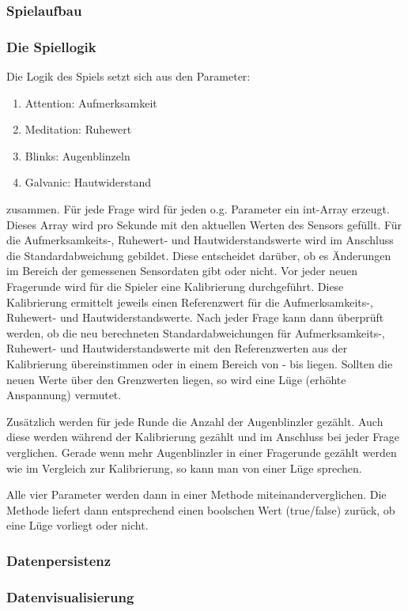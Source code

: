 	\subsubsection{Spielaufbau}
	
	
	\subsubsection*{Die Spiellogik}
	
	Die Logik des Spiels setzt sich aus den Parameter:
	\begin{enumerate}
	\item Attention: Aufmerksamkeit
	\item Meditation: Ruhewert
	\item Blinks: Augenblinzeln
	\item Galvanic: Hautwiderstand
	\end{enumerate}
	
zusammen.
Für jede Frage wird für jeden o.g. Parameter ein int-Array erzeugt. 
Dieses Array wird pro Sekunde mit den aktuellen Werten des Sensors gefüllt. 
Für die Aufmerksamkeits-, Ruhewert- und Hautwiderstandswerte wird im Anschluss die Standardabweichung gebildet. 
Diese entscheidet darüber, ob es Änderungen im Bereich der gemessenen Sensordaten gibt oder nicht. 
Vor jeder neuen Fragerunde wird für die Spieler eine Kalibrierung durchgeführt. 
Diese Kalibrierung ermittelt jeweils einen Referenzwert für die Aufmerksamkeits-, Ruhewert- und Hautwiderstandswerte. 
Nach jeder Frage kann dann überprüft werden, ob die neu berechneten Standardabweichungen für Aufmerksamkeits-, Ruhewert- und Hautwiderstandswerte mit den Referenzwerten aus der Kalibrierung übereinstimmen oder in einem Bereich von - bis liegen. 
Sollten die neuen Werte über den Grenzwerten liegen, so wird eine Lüge (erhöhte Anspannung) vermutet.

Zusätzlich werden für jede Runde die Anzahl der Augenblinzler gezählt. 
Auch diese werden während der Kalibrierung gezählt und im Anschluss bei jeder Frage verglichen. 
Gerade wenn mehr Augenblinzler in einer Fragerunde gezählt werden wie im Vergleich zur Kalibrierung, so kann man von einer Lüge sprechen.

Alle vier Parameter werden dann in einer Methode miteinanderverglichen.
Die Methode liefert dann entsprechend einen boolschen Wert (true/false) zurück, ob eine Lüge vorliegt oder nicht.
	
	\subsubsection{Datenpersistenz}
	
	
	\subsubsection{Datenvisualisierung}
